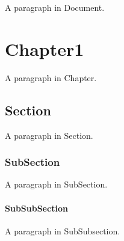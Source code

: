 \documentclass[a4paper,11pt,oneside,openany,report]{jsbook}
\begin{document}
A paragraph in Document.

\chapter{Chapter1}
A paragraph in Chapter.

\section{Section}
A paragraph in Section.

\subsection{SubSection}
A paragraph in SubSection.

\subsubsection{SubSubSection}
A paragraph in SubSubsection.
\end{document}
